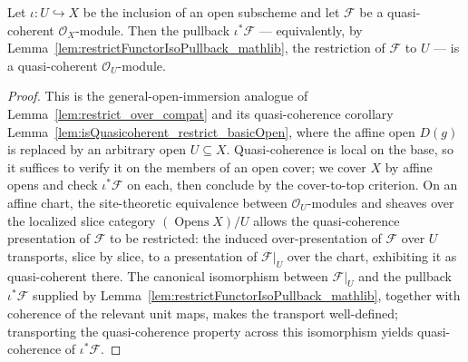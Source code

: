 \begin{lemma}
  \label{lem:isQuasicoherent_pullback_opens}
  Let \(\iota : U \hookrightarrow X\) be the inclusion of an open subscheme and let
  \(\mathcal{F}\) be a quasi-coherent \(\mathcal{O}_X\)-module. Then the pullback
  \(\iota^*\mathcal{F}\) --- equivalently, by
  Lemma~\ref{lem:restrictFunctorIsoPullback_mathlib}, the restriction of \(\mathcal{F}\)
  to \(U\) --- is a quasi-coherent \(\mathcal{O}_U\)-module.
\end{lemma}
\begin{proof}
  This is the general-open-immersion analogue of Lemma~\ref{lem:restrict_over_compat}
  and its quasi-coherence corollary Lemma~\ref{lem:isQuasicoherent_restrict_basicOpen},
  where the affine open \(D(g)\) is replaced by an arbitrary open \(U \subseteq X\).
  Quasi-coherence is local on the base, so it suffices to verify it on the members of
  an open cover; we cover \(X\) by affine opens and check \(\iota^*\mathcal{F}\) on
  each, then conclude by the cover-to-top criterion. On an affine chart, the
  site-theoretic equivalence between \(\mathcal{O}_U\)-modules and sheaves over the
  localized slice category \((\operatorname{Opens} X)/U\) allows the quasi-coherence
  presentation of \(\mathcal{F}\) to be restricted: the induced over-presentation of
  \(\mathcal{F}\) over \(U\) transports, slice by slice, to a presentation of
  \(\mathcal{F}|_U\) over the chart, exhibiting it as quasi-coherent there. The
  canonical isomorphism between \(\mathcal{F}|_U\) and the pullback
  \(\iota^*\mathcal{F}\) supplied by
  Lemma~\ref{lem:restrictFunctorIsoPullback_mathlib}, together with coherence of the
  relevant unit maps, makes the transport well-defined; transporting the
  quasi-coherence property across this isomorphism yields quasi-coherence of
  \(\iota^*\mathcal{F}\).
\end{proof}

